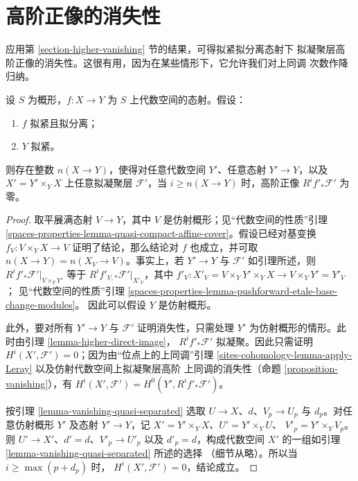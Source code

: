 \section{高阶正像的消失性}
\label{section-vanishing-higher-direct-images}

\noindent
应用第 \ref{section-higher-vanishing} 节的结果，可得拟紧拟分离态射下
拟凝聚层高阶正像的消失性。这很有用，因为在某些情形下，它允许我们对上同调
次数作降归纳。

\begin{lemma}
\label{lemma-vanishing-higher-direct-images}
设 $S$ 为概形，$f : X \to Y$ 为 $S$ 上代数空间的态射。假设：
\begin{enumerate}
\item $f$ 拟紧且拟分离；
\item $Y$ 拟紧。
\end{enumerate}
则存在整数 $n(X \to Y)$，使得对任意代数空间 $Y'$、任意态射
$Y' \to Y$，以及 $X' = Y' \times_Y X$ 上任意拟凝聚层
$\mathcal{F}'$，当 $i \geq n(X \to Y)$ 时，高阶正像
$R^if'_*\mathcal{F}'$ 为零。
\end{lemma}

\begin{proof}
取平展满态射 $V \to Y$，其中 $V$ 是仿射概形；见“代数空间的性质”引理
\ref{spaces-properties-lemma-quasi-compact-affine-cover}。假设已经对基变换
$f_V : V \times_Y X \to V$ 证明了结论，那么结论对 $f$ 也成立，并可取
$n(X \to Y) = n(X_V \to V)$。事实上，若 $Y' \to Y$ 与
$\mathcal{F}'$ 如引理所述，则 $R^if'_*\mathcal{F}'|_{V \times_Y Y'}$
等于 $R^if'_{V, *}\mathcal{F}'|_{X'_V}$，其中
$f'_V : X'_V = V \times_Y Y' \times_Y X \to V \times_Y Y' = Y'_V$；
见“代数空间的性质”引理
\ref{spaces-properties-lemma-pushforward-etale-base-change-modules}。
因此可以假设 $Y$ 是仿射概形。

\medskip\noindent
此外，要对所有 $Y' \to Y$ 与 $\mathcal{F}'$ 证明消失性，只需处理 $Y'$
为仿射概形的情形。此时由引理 \ref{lemma-higher-direct-image}，
$R^if'_*\mathcal{F}'$ 拟凝聚。因此只需证明
$H^i(X', \mathcal{F}') = 0$；因为由“位点上的上同调”引理
\ref{sites-cohomology-lemma-apply-Leray} 以及仿射代数空间上拟凝聚层高阶
上同调的消失性（命题 \ref{proposition-vanishing}），有
$H^i(X', \mathcal{F}') = H^0(Y', R^if'_*\mathcal{F}')$。

\medskip\noindent
按引理 \ref{lemma-vanishing-quasi-separated} 选取
$U \to X$、$d$、$V_p \to U_p$ 与 $d_p$。对任意仿射概形 $Y'$ 及态射
$Y' \to Y$，记
$X' = Y' \times_Y X$、$U' = Y' \times_Y U$、
$V'_p = Y' \times_Y V_p$。则
$U' \to X'$、$d' = d$、$V'_p \to U'_p$ 以及 $d'_p = d$，构成代数空间
$X'$ 的一组如引理 \ref{lemma-vanishing-quasi-separated} 所述的选择
（细节从略）。所以当 $i \geq \max(p + d_p)$ 时，
$H^i(X', \mathcal{F}') = 0$，结论成立。
\end{proof}

